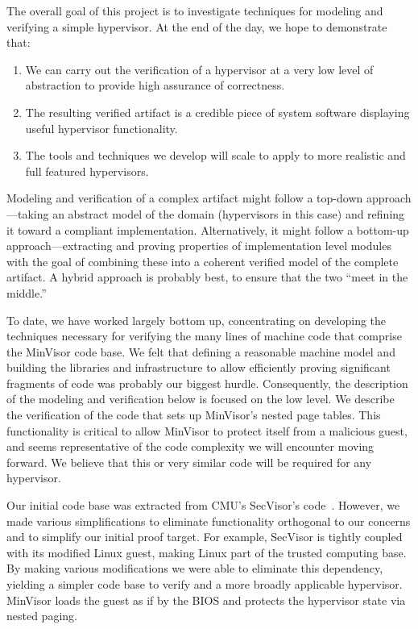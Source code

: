 \documentclass[submission,copyright]{eptcs} \providecommand{\event}{ACL2 2011}
\begin{document}
The overall goal of this project is to investigate techniques for
modeling and verifying a simple hypervisor.  At the end of the day, we
hope to demonstrate that:
\begin{enumerate}
\item We can carry out the verification of a hypervisor at a very low
  level of abstraction to provide high assurance of correctness.
\item The resulting verified artifact is a credible piece of
  system software displaying useful hypervisor functionality.
\item The tools and techniques we develop will scale to apply to
  more realistic and full featured hypervisors. 
\end{enumerate}

Modeling and verification of a complex artifact might follow a
top-down approach---taking an abstract model of the domain
(hypervisors in this case) and refining it toward a compliant
implementation.  Alternatively, it might follow a bottom-up
approach---extracting and proving properties of implementation level
modules with the goal of combining these into a coherent verified
model of the complete artifact.  A hybrid approach is probably best,
to ensure that the two ``meet in the middle.''

To date, we have worked largely bottom up, concentrating on developing
the techniques necessary for verifying the many lines of machine code
that comprise the MinVisor code base.  We felt that defining a
reasonable machine model and building the libraries and infrastructure
to allow efficiently proving significant fragments of code was
probably our biggest hurdle.  Consequently, the description of the
modeling and verification below is focused on the low level.  We
describe the verification of the code that sets up MinVisor's nested
page tables.  This functionality is critical to allow MinVisor to
protect itself from a malicious guest, and seems representative of the
code complexity we will encounter moving forward.  We believe that
this or very similar code will be required for any hypervisor.

Our initial code base was extracted from CMU's SecVisor's
code~\cite{SecVisor}.  However, we made various simplifications to
eliminate functionality orthogonal to our concerns and to simplify our
initial proof target.  For example, SecVisor is tightly coupled with
its modified Linux guest, making Linux part of the trusted computing
base.  By making various modifications we were able to eliminate this
dependency, yielding a simpler code base to verify and a more broadly
applicable hypervisor.  MinVisor loads the guest as if by the BIOS and
protects the hypervisor state via nested paging.
\end{document}
